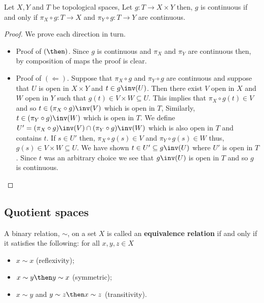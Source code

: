 \documentclass[12pt, a4paper]{article}
\begin{document}
\begin{theorem}
    Let \(X,Y\) and \(T\) be topological spaces, Let \(g : T \to X \times Y\) then, \(g\) is continuous if and only if \(\pi_X \circ g : T \to X\) and \(\pi_Y \circ g : T \to Y\) are continuous.
\end{theorem}

\begin{proof}
    We prove each direction in turn.
    \begin{itemize}
        \item Proof of \((\then)\).
        Since \(g\) is continuous and \(\pi_X\) and \(\pi_Y\) are continuous then, by composition of maps the proof is clear.
        \item Proof of \((\Leftarrow)\).
        Suppose that \(\pi_X \circ g\) and \(\pi_Y \circ g\) are continuous and suppose that \(U\) is open in \(X \times Y\) and \(t \in g\inv(U)\). Then there exist \(V\) open in \(X\) and \(W\) open in \(Y\) such that \(g(t) \in V \times W \subseteq U\). This implies that \(\pi_X \circ g(t) \in V\) and so \(t \in (\pi_X \circ g)\inv(V)\) which is open in \(T\), Similarly, \(t \in (\pi_Y \circ g)\inv(W)\) which is open in \(T\). We define \(U' = (\pi_X \circ g)\inv(V) \cap (\pi_Y \circ g)\inv(W)\) which is also open in \(T\) and contains \(t\). If \(s \in U'\) then, \(\pi_X \circ g(s) \in V\) and \(\pi_Y \circ g(s) \in W\) thus, \(g(s) \in V \times W \subseteq U\). We have shown \(t \in U' \subseteq g\inv(U)\) where \(U'\) is open in \(T\). Since \(t\) was an arbitrary choice we see that \(g\inv(U)\) is open in \(T\) and so \(g\) is continuous.
    \end{itemize}
\end{proof}

\subsection{Quotient spaces}

\begin{definition}
    A binary relation, \(\sim\), on a set \(X\) is called an \textbf{equivalence relation} if and only if it satisfies the following: for all \(x,y,z \in X\)
    \begin{itemize}
        \item \(x \sim x\) (reflexivity);
        \item \(x\sim y \then y \sim x\) (symmetric);
        \item \(x \sim y\) and \(y \sim z \then x \sim z\) (transitivity).
    \end{itemize}
\end{definition}
\end{document}
